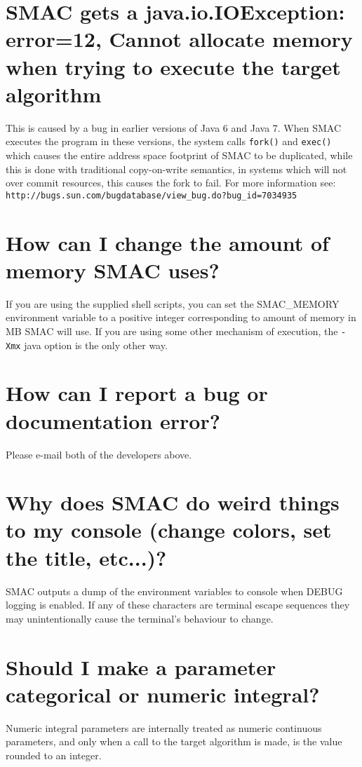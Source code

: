 \documentclass[11pt,letterpaper,oneside]{article}
\begin{document}
\section{SMAC gets a java.io.IOException: error=12, Cannot allocate memory when trying to execute the target algorithm}

This is caused by a bug in earlier versions of Java 6 and Java 7. When SMAC executes the program in these versions, the system calls \texttt{fork()} and \texttt{exec()} which causes the entire address space footprint of SMAC to be duplicated, while this is done with traditional copy-on-write semantics, in systems which will not over commit resources, this causes the fork to fail. For more information see: \texttt{http://bugs.sun.com/bugdatabase/view\_bug.do?bug\_id=7034935}


\section{How can I change the amount of memory SMAC uses?}

If you are using the supplied shell scripts, you can set the SMAC\_MEMORY environment variable to a positive integer corresponding to amount of memory in MB SMAC will use. If you are using some other mechanism of execution, the \texttt{-Xmx} java option is the only other way.

\section{How can I report a bug or documentation error?}
 Please e-mail both of the developers above.

\section{Why does SMAC do weird things to my console (change colors, set the title, etc...)?}

SMAC outputs a dump of the environment variables to console when DEBUG logging is enabled. If any of these characters are terminal escape sequences they may unintentionally cause the terminal's behaviour to change.

\section{Should I make a parameter categorical or numeric integral?}

	Numeric integral parameters are internally treated as numeric continuous parameters, and only when a call to the target algorithm is made, is the value rounded to an integer. 
	
\end{document}
